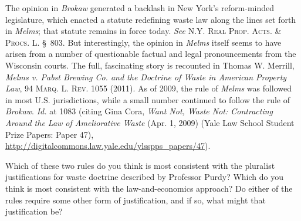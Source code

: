The opinion in \textit{Brokaw} generated a backlash in New York's reform-minded
legislature, which enacted a statute redefining waste law along the lines set
forth in \textit{Melms}; that statute remains in force today. \textit{See}
\textsc{N.Y. Real Prop. Acts. \& Procs. L.} {\S}~803. But interestingly, the
opinion in \textit{Melms} itself seems to have arisen from a number of
questionable factual and legal pronouncements from the Wisconsin courts. The
full, fascinating story is recounted in Thomas W. Merrill, \emph{\emph{Melms v.
Pabst Brewing Co.} and the Doctrine of Waste in American Property Law},
94
\textsc{Marq. L. Rev}. 1055 (2011). As of 2009, the rule of \textit{Melms} was
followed in most U.S. jurisdictions, while a small number continued to follow
the rule of \textit{Brokaw}. \textit{Id.} at 1083 (citing Gina Cora,
\textit{Want Not, Waste Not: Contracting Around the Law of Ameliorative Waste}
(Apr. 1, 2009) (Yale Law School Student Prize Papers: Paper 47), 
\url{http://digitalcommons.law.yale.edu/ylsspps_papers/47}).

Which of these two rules do you think is most consistent with the pluralist
justifications for waste doctrine described by Professor Purdy? Which do you
think is most consistent with the law-and-economics approach? Do either of the
rules require some other form of justification, and if so, what might that
justification be?

